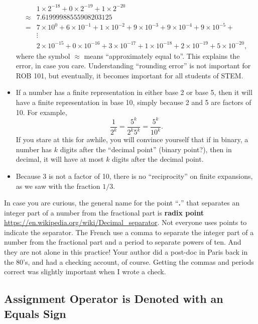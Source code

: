 \begin{itemize}
\begin{align*}
     &  1 \times 2^{-18} + 0 \times 2^{-19} + 1 \times 2^{-20} \\
     \approx& 7.619 999 885 559 082 031 25 \\
     =& 7 \times 10^{0} + 6 \times 10^{-1} + 1 \times 10^{-2} + 9 \times 10^{-3} +  9 \times 10^{-4} +  9 \times 10^{-5} + \\
     & \vdots \\
    & 2 \times 10^{-15}+ 0 \times 10^{-16}+  3 \times 10^{-17} +  1 \times 10^{-18}  +  2 \times 10^{-19} +  5 \times 10^{-20}, 
\end{align*}
where the symbol $\approx$ means ``approximately equal to''. This explains the error, in case you care. Understanding ``rounding error'' is not important for ROB 101, but eventually, it becomes important for all students of STEM.
\item If a number has a finite representation in either base 2 or base 5, then it will have a finite representation in base 10, simply because 2 and 5 are factors of 10. For example, 
$$\frac{1}{2^k} = \frac{5^k}{2^k 5 ^k} = \frac{5^k}{10 ^k}.$$
If you stare at this for awhile, you will convince yourself that if in binary, a number has $k$ digits after the ``decimal point'' (binary point?), then in decimal, it will have at most $k$ digits after the decimal point. 
\item Because 3 is not a factor of 10, there is no ``reciprocity'' on finite expansions, as we saw with the fraction $1/3$.    
    \end{itemize}


\begin{notation} In case you are curious, the general name for the point ``\textbf{\large .}'' that separates an integer part of a number from the fractional part is \textbf{radix point} \url{https://en.wikipedia.org/wiki/Decimal_separator}. Not everyone uses points to indicate the separator. The French use a comma to separate the integer part of a number from the fractional part and a period to separate powers of ten. And they are not alone in this practice! Your author did a post-doc in Paris back in the 80's, and had a checking account, of course. Getting the commas and periods correct was slightly important when I wrote a check.
\end{notation}


\subsection{Assignment Operator is Denoted with an Equals Sign}

